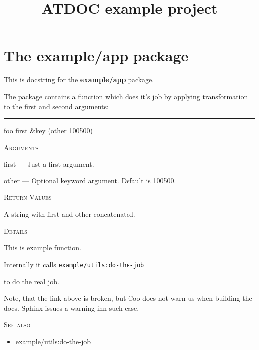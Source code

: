 \documentclass[a4paper]{report}
\begin{document}
    

    \title{ATDOC example project}
    \maketitle

    \tableofcontents
    \newpage

    
    \chapter{The example/app package}
    This is docstring for the \textbf{example/app} package.


                   The package contains a function which does it's job by
                   applying transformation to the first and second arguments:

                   

    \rule{\linewidth}{0.1mm}
    
    \label{example/app__fun__foo}
    \begin{defun}[Function]
    foo first &key (other 100500)


    
    \bigskip
    \textsc{Arguments}

first
	--- Just a first argument.

other
	--- Optional keyword argument. Default is 100500.




    
    \bigskip
    \textsc{Return Values}

A string with first and other concatenated.


	
    \bigskip
    \textsc{Details}

This is example function.         

   Internally it calls \hyperref[example/utils__fun__do-the-job]{\texttt{example/utils:do-the-job}}
  
   to do the real job.


   Note, that the link above is broken, but Coo does not warn us when building the docs.
   Sphinx issues a warning inn such case.


      
    \bigskip
    \textsc{See also}


	
    \begin{itemize}
    
	  
    \item
    \hyperref[example/utils__fun__do-the-job]{example/utils:do-the-job}
    
	
    \end{itemize}
  
      


    
    \end{defun}
  
\end{document}
